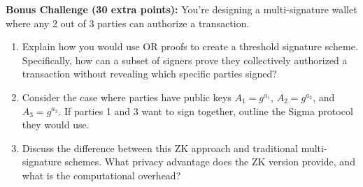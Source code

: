 \documentclass[10pt,a4paper,american]{article}
\begin{document}
\begin{tcolorbox}[colframe=EarthBrown!30!white,colback=EarthBrown!5!white]
	\textbf{Bonus Challenge (30 extra points):} You're designing a multi-signature wallet where any 2 out of 3 parties can authorize a transaction.
	\begin{enumerate}
		\item Explain how you would use OR proofs to create a threshold signature scheme. Specifically, how can a subset of signers prove they collectively authorized a transaction without revealing which specific parties signed?
		\item Consider the case where parties have public keys $A_1 = g^{a_1}$, $A_2 = g^{a_2}$, and $A_3 = g^{a_3}$. If parties 1 and 3 want to sign together, outline the Sigma protocol they would use.
		\item Discuss the difference between this ZK approach and traditional multi-signature schemes. What privacy advantage does the ZK version provide, and what is the computational overhead?
	\end{enumerate}
\end{tcolorbox}
\end{document}
